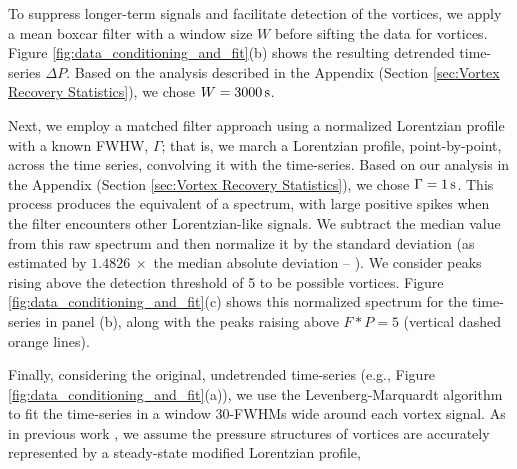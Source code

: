 \documentclass{aastex63}
\begin{document}
To suppress longer-term signals and facilitate detection of the vortices, we apply a mean boxcar filter with a window size $W$ before sifting the data for vortices. Figure \ref{fig:data_conditioning_and_fit}(b) shows the resulting detrended time-series $\Delta P$. Based on the analysis described in the Appendix (Section \ref{sec:Vortex Recovery Statistics}), we chose $W = 3000\,{\rm s}$. 

Next, we employ a matched filter approach \citep[][ch.~13]{Press2007} using a normalized Lorentzian profile with a known FWHW, $\Gamma$; that is, we march a Lorentzian profile, point-by-point, across the time series, convolving it with the time-series. Based on our analysis in the Appendix (Section \ref{sec:Vortex Recovery Statistics}), we chose $\Gamma = 1\,{\rm s}$. This process produces the equivalent of a spectrum, with large positive spikes when the filter encounters other Lorentzian-like signals. We subtract the median value from this raw spectrum and then normalize it by the standard deviation (as estimated by $1.4826\ \times$ the median absolute deviation -- \citealp{doi:10.1080/01621459.1993.10476408}). We consider peaks rising above the detection threshold of 5 to be possible vortices. Figure \ref{fig:data_conditioning_and_fit}(c) shows this normalized spectrum for the time-series in panel (b), along with the peaks raising above $F \ast P = 5$ (vertical dashed orange lines). 

Finally, considering the original, undetrended time-series (e.g., Figure \ref{fig:data_conditioning_and_fit}(a)), we use the Levenberg-Marquardt algorithm \citep[cf.][]{Press2007} to fit the time-series in a window 30-FWHMs wide around each vortex signal. As in previous work \citep[e.g.,][]{2016JGRE..121.1514K}, we assume the pressure structures of vortices are accurately represented by a steady-state modified Lorentzian profile,
\end{document}
